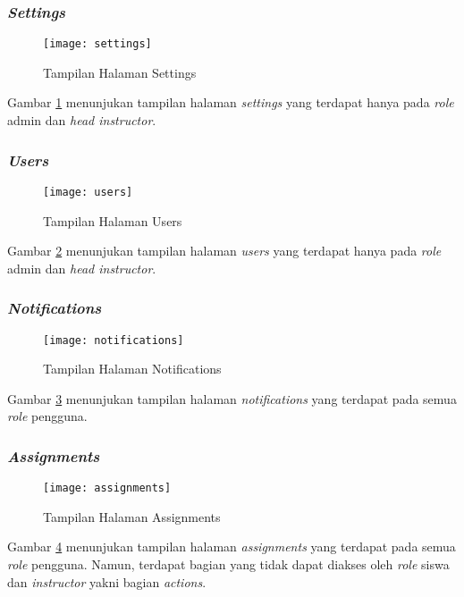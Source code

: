 \subsubsection{\textit{Settings}}
\begin{figure}[H]
	\centering  
	\texttt{[image: settings]}  
	\caption[Tampilan Halaman \textit{Settings}]{Tampilan Halaman Settings} 
	\label{fig:settings} 
\end{figure}

Gambar \ref{fig:settings} menunjukan tampilan halaman \textit{settings} yang terdapat hanya pada \textit{role} admin dan \textit{head instructor}. 

\subsubsection{\textit{Users}}
\begin{figure}[H]
	\centering  
	\texttt{[image: users]}  
	\caption[Tampilan Halaman \textit{Users}]{Tampilan Halaman Users} 
	\label{fig:users} 
\end{figure}

Gambar \ref{fig:users} menunjukan tampilan halaman \textit{users} yang terdapat hanya pada \textit{role} admin dan \textit{head instructor}.

\subsubsection{\textit{Notifications}}
\begin{figure}[H]
	\centering  
	\texttt{[image: notifications]}  
	\caption[Tampilan Halaman \textit{Notifications}]{Tampilan Halaman Notifications} 
	\label{fig:notifications} 
\end{figure}

Gambar \ref{fig:notifications} menunjukan tampilan halaman \textit{notifications} yang terdapat pada semua \textit{role} pengguna.

\subsubsection{\textit{Assignments}}
\begin{figure}[H]
	\centering  
	\texttt{[image: assignments]}  
	\caption[Tampilan Halaman \textit{Assignments}]{Tampilan Halaman Assignments} 
	\label{fig:assignments} 
\end{figure}

Gambar \ref{fig:assignments} menunjukan tampilan halaman \textit{assignments} yang terdapat pada semua \textit{role} pengguna. Namun, terdapat bagian yang tidak dapat diakses oleh \textit{role} siswa dan \textit{instructor} yakni bagian \textit{actions}.
